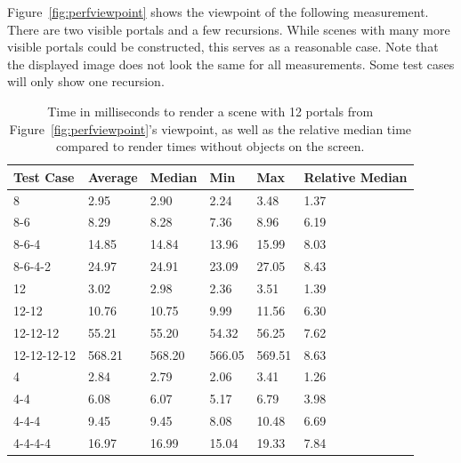 Figure~\ref{fig:perfviewpoint} shows the viewpoint of the following measurement. There are two visible portals and a few recursions. While scenes with many more visible portals could be constructed, this serves as a reasonable case. Note that the displayed image does not look the same for all measurements. Some test cases will only show one recursion.

\begin{table}[H]
	\centering
	\begin{tabular}{|l|l|l|l|l|l|}
		\hline
		Test Case   & Average & Median & Min    & Max    & Relative Median \\ \hline
		8           & 2.95    & 2.90   & 2.24   & 3.48   & 1.37            \\ \hline
		8-6         & 8.29    & 8.28   & 7.36   & 8.96   & 6.19            \\ \hline
		8-6-4       & 14.85   & 14.84  & 13.96  & 15.99  & 8.03            \\ \hline
		8-6-4-2     & 24.97   & 24.91  & 23.09  & 27.05  & 8.43            \\ \hline
		12          & 3.02    & 2.98   & 2.36   & 3.51   & 1.39            \\ \hline
		12-12       & 10.76   & 10.75  & 9.99   & 11.56  & 6.30            \\ \hline
		12-12-12    & 55.21   & 55.20  & 54.32  & 56.25  & 7.62            \\ \hline
		12-12-12-12 & 568.21  & 568.20 & 566.05 & 569.51 & 8.63            \\ \hline
		4           & 2.84    & 2.79   & 2.06   & 3.41   & 1.26            \\ \hline
		4-4         & 6.08    & 6.07   & 5.17   & 6.79   & 3.98            \\ \hline
		4-4-4       & 9.45    & 9.45   & 8.08   & 10.48  & 6.69            \\ \hline
		4-4-4-4     & 16.97   & 16.99  & 15.04  & 19.33  & 7.84            \\ \hline
	\end{tabular}
	\caption{Time in milliseconds to render a scene with 12 portals from Figure~\ref{fig:perfviewpoint}'s viewpoint, as well as the relative median time compared to render times without objects on the screen.}
	\label{tab:perfviewpoint}
\end{table}

